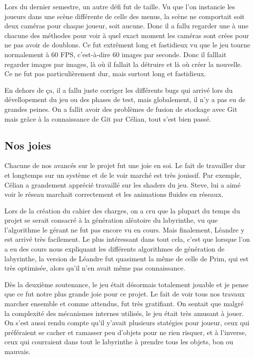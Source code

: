 \documentclass{article}
\begin{document}
Lors du dernier semestre, un autre défi fut de taille. Vu que l'on instancie les joueurs dans une scène différente de celle des menus, la scène ne comportait soit deux caméras pour chaque joueur, soit aucune. Donc il a fallu regarder une à une chacune des méthodes pour voir à quel exact moment les caméras sont crées pour ne pas avoir de doublons. Ce fut extrêment long et fastidieux vu que le jeu tourne normalement à 60 FPS, c'est-à-dire 60 images par seconde. Donc il falllait regarder images par images, là où il fallait la détruire et là où créer la nouvelle. Ce ne fut pas particulièrement dur, mais surtout long et fastidieux.

En dehors de ça, il a fallu juste corriger les différents bugs qui arrivé lors du dévellopement du jeu ou des phases de test, mais globalement, il n'y a pas eu de grandes peines. On a fallit avoir des problèmes de fusion de stockage avec Git mais grâce à la connaissance de Git par Célian, tout s'est bien passé.

\subsection{Nos joies}
Chacune de nos avancés sur le projet fut une joie en soi. Le fait de travailler dur et longtemps sur un système et de le voir marché est très jouissif. Par exemple, Célian a grandement apprécié travaillé sur les shaders du jeu. Steve, lui a aimé voir le réseau marchait correctement et les animations fluides en réseaux. 

Lors de la création du cahier des charges, on a cru que la plupart du temps du projet se serait consacré à la génération aléatoire du labyrinthe, vu que l'algorithme le gérant ne fut pas encore vu en cours. Mais finalement, Léandre y est arrivé très facilement. Le plus intéressant dans tout cela, c'est que lorsque l'on a eu des cours nous expliquant les différents algorithmes de génération de labyrinthe, la version de Léandre fut quasiment la même de celle de Prim, qui est très optimisée, alors qu'il n'en avait même pas connaissance. 

Dès la deuxième soutenance, le jeu était désormais totalement jouable et je pense que ce fut notre plus grande joie pour ce projet. Le fait de voir tous nos travaux marcher ensemble et comme attendus, fut très gratifiant. On sentait que malgré la complexité des mécanismes internes utilisés, le jeu était très amusant à jouer. On s'est aussi rendu compte qu'il y'avait plusieurs statégies pour joueur, ceux qui préféraient se cacher et ramasser peu d'objets pour ne rien risquer, et à l'inverse, ceux qui courraient dans tout le labyrinthe à prendre tous les objets, bon ou mauvais.
\end{document}
